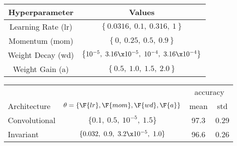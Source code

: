 \begin{table}[hbt]
  \centering
  \label{tab:ch5:hyper_options}
  \begin{tabular}{c c}
    \toprule
    Hyperparameter & Values \\
    \midrule
    Learning Rate (lr) & $\left\{ 0.0316,\ 0.1,\ 0.316,\ 1 \right\}$ \\
    Momentum (mom) & $\left\{ 0,\ 0.25,\ 0.5,\ 0.9 \right\}$ \\
    Weight Decay (wd) & $\left\{ 10^{-5},\ 3.16\x 10^{-5},\ 10^{-4},\ 3.16\x 10^{-4} \right\} $\\
    Weight Gain (a) & $\left\{0.5,\ 1.0,\ 1.5,\ 2.0 \right\}$
    \\\bottomrule
  \end{tabular}
\end{table}

\begin{table}[hbt]
  \centering
  \label{tab:ch5:mnist_initial_results}
  \begin{tabular}{@{}l c c c@{}}
    \toprule
     & &\multicolumn{2}{c}{accuracy} \\\cline{3-4}
    Architecture & $\theta = \{\F{lr}, \F{mom}, \F{wd}, \F{a}\}$ & mean & std  \\\midrule
    Convolutional & $\{0.1,\ 0.5,\ 10^{-5},\ 1.5 \}$ & 97.3 & 0.29 \\
    Invariant & $\{0.032,\ 0.9,\ 3.2\x 10^{-5},\ 1.0 \}$ & 96.6 & 0.26 \\
    \bottomrule
  \end{tabular}
\end{table}
